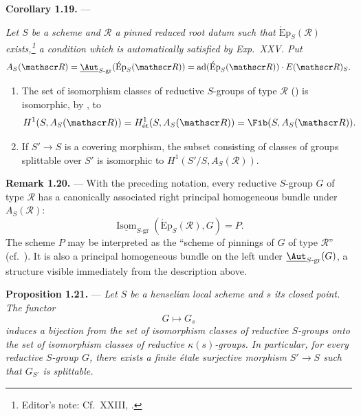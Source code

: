 \medskip\noindent\textbf{Corollary 1.19.} ---
{\itshape Let \(S\) be a scheme and \(\mathscr R\) a pinned reduced root
datum such that \(\operatorname{\acute{E}p}_S(\mathscr R)\)
exists,\footnote{Editor's note: Cf.\ XXIII, .} a
condition which is automatically satisfied by Exp.~XXV. Put
\[
  A_S(\mathscr R)
  =
  \underline{\Aut}_{S\text{-}\mathrm{gr}}
    (\operatorname{\acute{E}p}_S(\mathscr R))
  =
  \operatorname{ad}(\operatorname{\acute{E}p}_S(\mathscr R))
  \cdot E(\mathscr R)_S.
\]
\begin{enumerate}
\item[\SGAInlineRefTarget{sga3:xxiv:1.19:item:i}(i)] The set of isomorphism classes of reductive \(S\)-groups
of type \(\mathscr R\) () is isomorphic, by
, to
\[
  H^1(S,A_S(\mathscr R))
  =
  H^1_{\mathrm{\acute et}}(S,A_S(\mathscr R))
  =
  \Fib(S,A_S(\mathscr R)).
\]
\item[\SGAInlineRefTarget{sga3:xxiv:1.19:item:ii}(ii)] If \(S'\to S\) is a covering morphism, the subset
consisting of classes of groups splittable over \(S'\) is isomorphic
to \(H^1(S'/S,A_S(\mathscr R))\).
\end{enumerate}}

\medskip\noindent\textbf{Remark 1.20.} ---
With the preceding notation, every reductive \(S\)-group \(G\) of
type \(\mathscr R\) has a canonically associated right principal
homogeneous bundle under \(A_S(\mathscr R)\):
\[
  \underline{\operatorname{Isom}}_{S\text{-}\mathrm{gr}}
    (\operatorname{\acute{E}p}_S(\mathscr R),G)=P.
\]
The scheme \(P\) may be interpreted as the ``scheme of pinnings of
\(G\) of type \(\mathscr R\)'' (cf.\ ). It is also a principal
homogeneous bundle on the left under
\(\underline{\Aut}_{S\text{-}\mathrm{gr}}(G)\), a structure visible
immediately from the description above.

\medskip\noindent\textbf{Proposition 1.21.} ---
{\itshape Let \(S\) be a henselian local scheme and \(s\) its closed
point. The functor
\[
  G\longmapsto G_s
\]
induces a bijection from the set of isomorphism classes of reductive
\(S\)-groups onto the set of isomorphism classes of reductive
\(\kappa(s)\)-groups. In particular, for every reductive \(S\)-group
\(G\), there exists a finite étale surjective morphism \(S'\to S\)
such that \(G_{S'}\) is splittable.}

